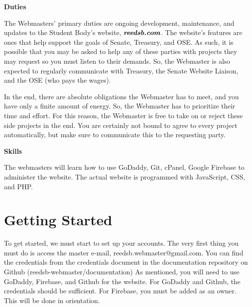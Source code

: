 \documentclass[a4paper]{article}
\begin{document}
\newpage
\medskip
\begin{center}
\textbf{Duties}
\end{center}
The Webmasters' primary duties are ongoing development, maintenance, and updates to the Student Body’s website, $\textbf{\textit{reedsb.com}}$. The website's features are ones that help support the goals of Senate, Treasury, and OSE. As such, it is possible that you may be asked to help any of these parties with projects they may request so you must listen to their demands. So, the Webmaster is also expected to regularly communicate with Treasury, the Senate Website Liaison, and the OSE (who pays the wages).

\begin{remark*}[Prioritize!]
In the end, there are absolute obligations the Webmaster has to meet, and you have only a finite amount of energy. So, the Webmaster has to prioritize their time and effort. For this reason, the Webmaster is free to take on or reject these side projects in the end. You are certainly not bound to agree to every project automatically, but make sure to communicate this to the requesting party.
\end{remark*}



\begin{center}
\textbf{Skills}
\end{center}
The webmasters will learn how to use GoDaddy, Git, cPanel, Google Firebase to administer the website. The actual website is programmed with JavaScript, CSS, and PHP. \newline

\section{Getting Started}
To get started, we must start to set up your accounts. The very first thing you must do is access the master e-mail, reedsb.webmaster@gmail.com. You can find the credentials from the credentials document in the documentation repository on Github (reedsb-webmaster/documentation) As mentioned, you will need to use GoDaddy, Firebase, and Github for the website. For GoDaddy and Github, the credentials should be sufficient. For Firebase, you must be added as an owner. This will be done in orientation.
\end{document}
